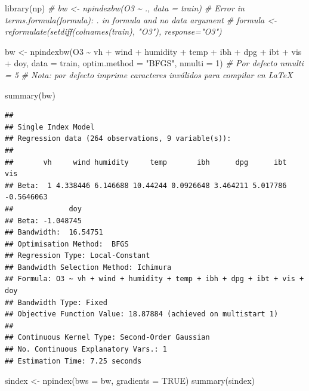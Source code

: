 \documentclass[
]{book}
\newenvironment{Shaded}{\begin{snugshade}}{\end{snugshade}}
\newcommand{\AttributeTok}[1]{\textcolor[rgb]{0.77,0.63,0.00}{#1}}
\newcommand{\CommentTok}[1]{\textcolor[rgb]{0.56,0.35,0.01}{\textit{#1}}}
\newcommand{\ConstantTok}[1]{\textcolor[rgb]{0.00,0.00,0.00}{#1}}
\newcommand{\DecValTok}[1]{\textcolor[rgb]{0.00,0.00,0.81}{#1}}
\newcommand{\FunctionTok}[1]{\textcolor[rgb]{0.00,0.00,0.00}{#1}}
\newcommand{\NormalTok}[1]{#1}
\newcommand{\OtherTok}[1]{\textcolor[rgb]{0.56,0.35,0.01}{#1}}
\newcommand{\SpecialCharTok}[1]{\textcolor[rgb]{0.00,0.00,0.00}{#1}}
\newcommand{\StringTok}[1]{\textcolor[rgb]{0.31,0.60,0.02}{#1}}
\theoremstyle{break}
\theoremstyle{definition}
\theoremstyle{definition}
\theoremstyle{definition}
\theoremstyle{definition}
\theoremstyle{remark}
\begin{document}
\begin{Shaded}
\begin{Highlighting}[]
\FunctionTok{library}\NormalTok{(np)}
\CommentTok{\# bw \textless{}{-} npindexbw(O3 \textasciitilde{} ., data = train)}
\CommentTok{\# Error in terms.formula(formula): \textquotesingle{}.\textquotesingle{} in formula and no \textquotesingle{}data\textquotesingle{} argument}
\CommentTok{\# formula \textless{}{-} reformulate(setdiff(colnames(train), "O3"), response="O3")}

\NormalTok{bw }\OtherTok{\textless{}{-}} \FunctionTok{npindexbw}\NormalTok{(O3 }\SpecialCharTok{\textasciitilde{}}\NormalTok{ vh }\SpecialCharTok{+}\NormalTok{ wind }\SpecialCharTok{+}\NormalTok{ humidity }\SpecialCharTok{+}\NormalTok{ temp }\SpecialCharTok{+}\NormalTok{ ibh }\SpecialCharTok{+}\NormalTok{ dpg }\SpecialCharTok{+}\NormalTok{ ibt }\SpecialCharTok{+}\NormalTok{ vis }\SpecialCharTok{+}\NormalTok{ doy,}
                \AttributeTok{data =}\NormalTok{ train, }\AttributeTok{optim.method =} \StringTok{"BFGS"}\NormalTok{, }\AttributeTok{nmulti =} \DecValTok{1}\NormalTok{) }\CommentTok{\# Por defecto nmulti = 5}
\CommentTok{\# Nota: por defecto imprime caracteres inválidos para compilar en LaTeX}
\end{Highlighting}
\end{Shaded}

\begin{Shaded}
\begin{Highlighting}[]
\FunctionTok{summary}\NormalTok{(bw)}
\end{Highlighting}
\end{Shaded}

\begin{verbatim}
## 
## Single Index Model
## Regression data (264 observations, 9 variable(s)):
## 
##       vh     wind humidity     temp       ibh      dpg      ibt        vis
## Beta:  1 4.338446 6.146688 10.44244 0.0926648 3.464211 5.017786 -0.5646063
##             doy
## Beta: -1.048745
## Bandwidth:  16.54751
## Optimisation Method:  BFGS
## Regression Type: Local-Constant
## Bandwidth Selection Method: Ichimura
## Formula: O3 ~ vh + wind + humidity + temp + ibh + dpg + ibt + vis + doy
## Bandwidth Type: Fixed
## Objective Function Value: 18.87884 (achieved on multistart 1)
## 
## Continuous Kernel Type: Second-Order Gaussian
## No. Continuous Explanatory Vars.: 1
## Estimation Time: 7.25 seconds
\end{verbatim}

\begin{Shaded}
\begin{Highlighting}[]
\NormalTok{sindex }\OtherTok{\textless{}{-}} \FunctionTok{npindex}\NormalTok{(}\AttributeTok{bws =}\NormalTok{ bw, }\AttributeTok{gradients =} \ConstantTok{TRUE}\NormalTok{)}
\FunctionTok{summary}\NormalTok{(sindex)}
\end{Highlighting}
\end{Shaded}
\end{document}
